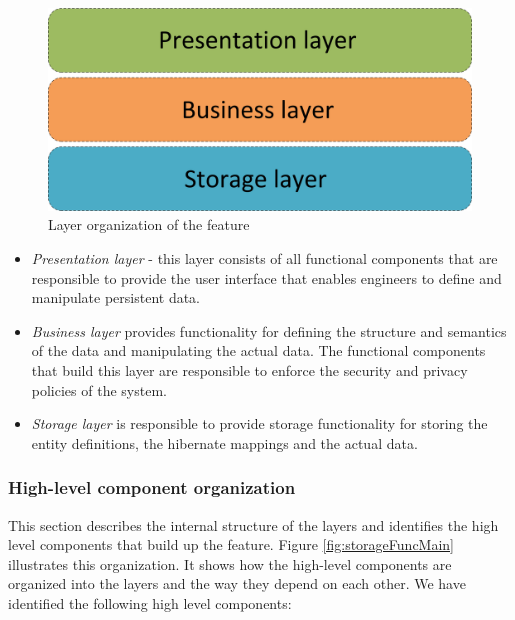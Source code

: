 \begin{figure}[h!]
  \centering
  	\includegraphics[scale=0.6]{storage/functional/layers.png}
  \caption{Layer organization of the feature}
  \label{fig:storageLayers}
\end{figure}

\begin{itemize}
	\item \textit{Presentation layer} - this layer consists of all functional components that are responsible to provide the user interface that enables engineers to define and manipulate persistent data.
	
	\item \textit{Business layer} provides functionality for defining the structure and semantics of the data and manipulating the actual data. The functional components that build this layer are responsible to enforce the security and privacy policies of the system.
	
	\item \textit{Storage layer } is responsible to provide storage functionality for storing the entity definitions, the hibernate mappings and the actual data.
\end{itemize}

\subsubsection{High-level component organization}
This section describes the internal structure of the layers and identifies the high level components that build up the feature. Figure \ref{fig:storageFuncMain} illustrates this organization. It shows how the high-level components are organized into the layers and the way they depend on each other. We have identified the following high level components:

